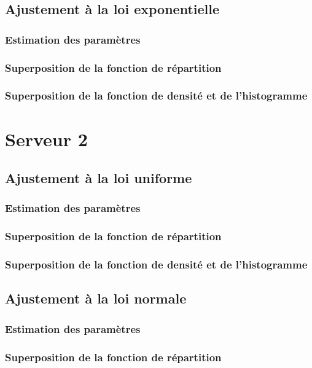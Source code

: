 \documentclass{article}
\begin{document}
\subsection {Ajustement à la loi exponentielle}

\subsubsection{Estimation des paramètres}
\subsubsection{Superposition de la fonction de répartition}
\subsubsection{Superposition de la fonction de densité et de l'histogramme}

\section{Serveur 2}

\subsection{Ajustement à la loi uniforme}

\subsubsection{Estimation des paramètres}
\subsubsection{Superposition de la fonction de répartition}
\subsubsection{Superposition de la fonction de densité et de l'histogramme}

\subsection{Ajustement à la loi normale}

\subsubsection{Estimation des paramètres}
\subsubsection{Superposition de la fonction de répartition}
\end{document}
